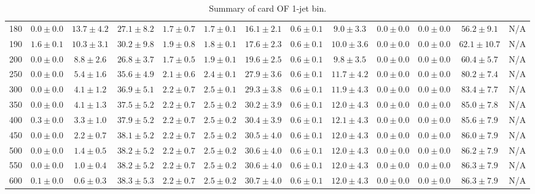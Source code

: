 \begin{table}
{\begin{center}
\begin{tabular}{l | c c | c c c c c c c c  | c c}
180 & $0.0\pm0.0$ & $13.7\pm4.2$ & $27.1\pm8.2$ & $1.7\pm0.7$ & $1.7\pm0.1$ & $16.1\pm2.1$ & $0.6\pm0.1$ & $9.0\pm3.3$ & $0.0\pm0.0$ & $0.0\pm0.0$ & $56.2\pm9.1$ &  N/A \\
190 & $1.6\pm0.1$ & $10.3\pm3.1$ & $30.2\pm9.8$ & $1.9\pm0.8$ & $1.8\pm0.1$ & $17.6\pm2.3$ & $0.6\pm0.1$ & $10.0\pm3.6$ & $0.0\pm0.0$ & $0.0\pm0.0$ & $62.1\pm10.7$ & N/A \\
200 & $0.0\pm0.0$ & $8.8\pm2.6$ & $26.8\pm3.7$ & $1.7\pm0.5$ & $1.9\pm0.1$ & $19.6\pm2.5$ & $0.6\pm0.1$ & $9.8\pm3.5$ & $0.0\pm0.0$ & $0.0\pm0.0$ & $60.4\pm5.7$ & N/A \\
250 & $0.0\pm0.0$ & $5.4\pm1.6$ & $35.6\pm4.9$ & $2.1\pm0.6$ & $2.4\pm0.1$ & $27.9\pm3.6$ & $0.6\pm0.1$ & $11.7\pm4.2$ & $0.0\pm0.0$ & $0.0\pm0.0$ & $80.2\pm7.4$ & N/A \\
300 & $0.0\pm0.0$ & $4.1\pm1.2$ & $36.9\pm5.1$ & $2.2\pm0.7$ & $2.5\pm0.1$ & $29.3\pm3.8$ & $0.6\pm0.1$ & $11.9\pm4.3$ & $0.0\pm0.0$ & $0.0\pm0.0$ & $83.4\pm7.7$ & N/A \\
350 & $0.0\pm0.0$ & $4.1\pm1.3$ & $37.5\pm5.2$ & $2.2\pm0.7$ & $2.5\pm0.2$ & $30.2\pm3.9$ & $0.6\pm0.1$ & $12.0\pm4.3$ & $0.0\pm0.0$ & $0.0\pm0.0$ & $85.0\pm7.8$ & N/A \\
400 & $0.3\pm0.0$ & $3.3\pm1.0$ & $37.9\pm5.2$ & $2.2\pm0.7$ & $2.5\pm0.2$ & $30.4\pm3.9$ & $0.6\pm0.1$ & $12.1\pm4.3$ & $0.0\pm0.0$ & $0.0\pm0.0$ & $85.6\pm7.9$ & N/A \\
450 & $0.0\pm0.0$ & $2.2\pm0.7$ & $38.1\pm5.2$ & $2.2\pm0.7$ & $2.5\pm0.2$ & $30.5\pm4.0$ & $0.6\pm0.1$ & $12.0\pm4.3$ & $0.0\pm0.0$ & $0.0\pm0.0$ & $86.0\pm7.9$ & N/A \\
500 & $0.0\pm0.0$ & $1.4\pm0.5$ & $38.2\pm5.2$ & $2.2\pm0.7$ & $2.5\pm0.2$ & $30.6\pm4.0$ & $0.6\pm0.1$ & $12.0\pm4.3$ & $0.0\pm0.0$ & $0.0\pm0.0$ & $86.2\pm7.9$ & N/A \\
550 & $0.0\pm0.0$ & $1.0\pm0.4$ & $38.2\pm5.2$ & $2.2\pm0.7$ & $2.5\pm0.2$ & $30.6\pm4.0$ & $0.6\pm0.1$ & $12.0\pm4.3$ & $0.0\pm0.0$ & $0.0\pm0.0$ & $86.3\pm7.9$ & N/A \\
600 & $0.1\pm0.0$ & $0.6\pm0.3$ & $38.3\pm5.3$ & $2.2\pm0.7$ & $2.5\pm0.2$ & $30.7\pm4.0$ & $0.6\pm0.1$ & $12.0\pm4.3$ & $0.0\pm0.0$ & $0.0\pm0.0$ & $86.3\pm7.9$ & N/A \\
\hline
\end{tabular}
\end{center}
}
\caption{Summary of card OF 1-jet bin.}
\end{table}
